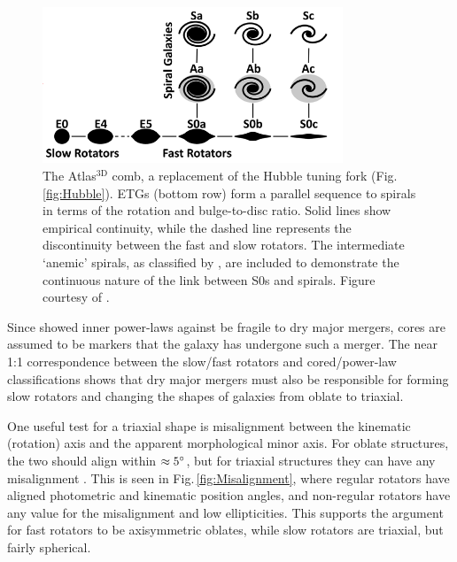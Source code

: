 	\begin{figure}
		\centering
		\includegraphics[width=0.8\textwidth]{introduction/Atlas3D_comb.png}
		\caption[The Atlas$^\text{3D}$ comb]{The Atlas$^\text{3D}$ comb, a replacement of the Hubble tuning fork (Fig.\,\ref{fig:Hubble}). ETGs (bottom row) form a parallel sequence to spirals in terms of the rotation and bulge-to-disc ratio. Solid lines show empirical continuity, while the dashed line represents the discontinuity between the fast and slow rotators. The intermediate `anemic' spirals, as classified by \citet{VandenBergh1976}, are included to demonstrate the continuous nature of the link between S0s and spirals. Figure courtesy of \citet{Cappellari2011a}.}
		\label{fig:Atlas3Dcomb}
	\end{figure}

	Since \citet{Sarzi2015} showed inner power-laws against be fragile to dry major mergers, cores are assumed to be markers that the galaxy has undergone such a merger. The near 1:1 correspondence between the slow/fast rotators and cored/power-law classifications shows that dry major mergers must also be responsible for forming slow rotators and changing the shapes of galaxies from oblate to triaxial.

	One useful test for a triaxial shape is misalignment between the kinematic (rotation) axis and the apparent morphological minor axis. For oblate structures, the two should align within $\approx 5\degree$, but for triaxial structures they can have any misalignment \citep[e.g.][]{Contopoulos1956, Stark1977, Statler1987}. This is seen in Fig.\,\ref{fig:Misalignment}, where regular rotators have aligned photometric and kinematic position angles, and non-regular rotators have any value for the misalignment and low ellipticities. This supports the argument for fast rotators to be axisymmetric oblates, while slow rotators are triaxial, but fairly spherical.

